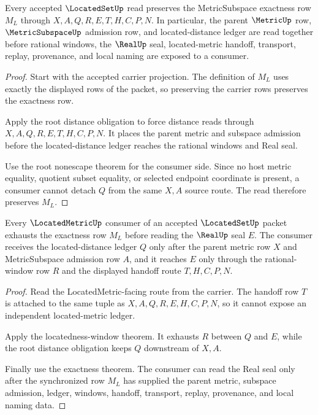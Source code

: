 \begin{theorem}
\label{thm:located-set-metric-subspace-exactness}
Every accepted $\LocatedSetUp$ read preserves the MetricSubspace exactness row $M_L$ through $X,A,Q,R,E,T,H,C,P,N$. In particular, the parent $\MetricUp$ row, $\MetricSubspaceUp$ admission row, and located-distance ledger are read together before rational windows, the $\RealUp$ seal, located-metric handoff, transport, replay, provenance, and local naming are exposed to a consumer.
\end{theorem}
\begin{proof}
Start with the accepted carrier projection. The definition of $M_L$ uses exactly the displayed rows of the packet, so preserving the carrier rows preserves the exactness row.

Apply the root distance obligation to force distance reads through $X,A,Q,R,E,T,H,C,P,N$. It places the parent metric and subspace admission before the located-distance ledger reaches the rational windows and Real seal.

Use the root nonescape theorem for the consumer side. Since no host metric equality, quotient subset equality, or selected endpoint coordinate is present, a consumer cannot detach $Q$ from the same $X,A$ source route. The read therefore preserves $M_L$.
\end{proof}

\begin{theorem}
\label{thm:located-set-locatedmetric-readback-coverage}
Every $\LocatedMetricUp$ consumer of an accepted $\LocatedSetUp$ packet exhausts the exactness row $M_L$ before reading the $\RealUp$ seal $E$. The consumer receives the located-distance ledger $Q$ only after the parent metric row $X$ and MetricSubspace admission row $A$, and it reaches $E$ only through the rational-window row $R$ and the displayed handoff route $T,H,C,P,N$.
\end{theorem}
\begin{proof}
Read the LocatedMetric-facing route from the carrier. The handoff row $T$ is attached to the same tuple as $X,A,Q,R,E,H,C,P,N$, so it cannot expose an independent located-metric ledger.

Apply the locatedness-window theorem. It exhausts $R$ between $Q$ and $E$, while the root distance obligation keeps $Q$ downstream of $X,A$.

Finally use the exactness theorem. The consumer can read the Real seal only after the synchronized row $M_L$ has supplied the parent metric, subspace admission, ledger, windows, handoff, transport, replay, provenance, and local naming data.
\end{proof}


